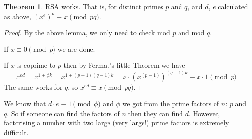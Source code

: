 \documentclass[12pt]{amsart}
\theoremstyle{definition}
\newtheorem{theorem}{Theorem}
\theoremstyle{definition}
\theoremstyle{remark}
\begin{document}
\begin{theorem}
RSA works. That is, for distinct primes $p$ and $q$, and $d$, $e$ calculated as above, $(x^e)^d \equiv x \pmod {pq}$.
\end{theorem}
\begin{proof}
By the above lemma, we only need to check mod $p$ and mod $q$.

If $x \equiv 0 \pmod p$ we are done.

If $x$ is coprime to $p$ then by Fermat's little Theorem we have
\[
x^{ed} = x^{1+\phi k}=x^{1+(p-1)(q-1)k}=x\cdot (x^{(p-1)})^{(q-1)k}\equiv x \cdot 1 \pmod p
\]
The same works for $q$, so $x^{ed}\equiv x \pmod {pq}$.
\end{proof}


\begin{center}
\end{center}


We know that $d\cdot e \equiv 1 \pmod \phi$ and $\phi$ we got from the prime factors of $n$: $p$ and $q$. So if someone can find the factors of $n$ then they can find $d$. However, factorising a number with two large (very large!) prime factors is extremely difficult.

%
%
\end{document}
